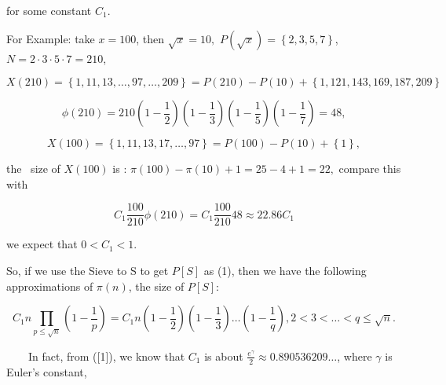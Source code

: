 \documentclass{article}
\begin{document}
for some constant \( C_{1}\). 
\vspace{1\baselineskip}


For Example:  take  \( x = 100\),  then  \(\sqrt{x} = 10,\) \( P\left(\sqrt{x}\right) =\left\{ 2,3,5,7\right\}\), \( N = 2\cdot 3\cdot 5\cdot 7 = 210\),

\begin{equation}
X\left(210\right) =\left\{  1, 11, 13, \ldots , 97,\ldots ,209\right\}  = P\left(210\right)- P\left(10\right)+\left\{ 1, 121, 143, 169, 187, 209\right\} 
\end{equation}


\begin{equation}
\phi\left(210\right) = 210\left(1-\frac{1}{2}\right)\left(1-\frac{1}{3}\right)\left(1-\frac{1}{5}\right)\left(1-\frac{1}{7}\right) = 48 ,  
\end{equation}


\begin{equation}
X\left(100\right) =\left\{  1, 11, 13, 17, \ldots , 97\right\}  = P\left(100\right)- P\left(10\right)+\left\{ 1\right\} ,
\end{equation}
\vspace{1\baselineskip}

the\  { size of }\( X\left(100\right)\) is {:} \( \pi\left(100\right)-\pi\left(10\right)+1 = 25-4+1 = 22,\) compare this with

\begin{equation}
C_{1}\frac{100}{210} \phi\left(210\right) = C_{1}\frac{100}{210} 48\approx 22.86C_{1}  
\end{equation}
\vspace{1\baselineskip}

we expect that \( 0<C_{1}<1\).
\vspace{1\baselineskip}

So, if we use the  {Sieve to S to get }\( P\left[S\right]\) { }as (1), then we have the following approximations of \( \pi\left(n\right)\), the size of \( P\left[S\right]\):

\begin{equation}
C_{1} n\prod_{p\leq\sqrt{n}}^{}\left(1-\frac{1}{p}\right) = C_{1} n\left(1-\frac{1}{2}\right)\left(1-\frac{1}{3}\right)\ldots \left(1-\frac{1}{q}\right) ,     2<3<\ldots <q\leq\sqrt{n} .  
\end{equation}

\vspace{1\baselineskip}

\ \ \ \ In fact, from ([1]), we know that \( C_{1}\) is about \(\frac{e^{\gamma }}{2}\approx 0.890536209\ldots\),  where $\gamma$ is Euler’s constant,
\end{document}
